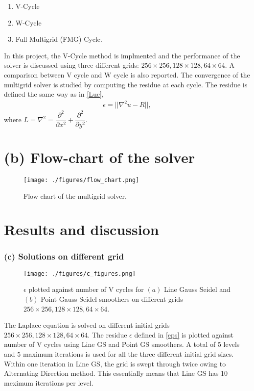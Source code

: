\documentclass[11pt]{report}
\begin{document}
\begin{enumerate}
\begin{enumerate}
\item V-Cycle
\item W-Cycle
\item Full Multigrid (FMG) Cycle.
\end{enumerate}
In this project, the V-Cycle method is implmented and the performance of the solver is discussed using three different grids: $256\times256, 128\times 128, 64\times64$. A comparison between V cycle and W cycle is also reported. The convergence of the multigrid solver is studied by computing the residue at each cycle. The residue is defined the same way as in \eqref{Lue},
\begin{align}
\epsilon=|\!|\nabla^2u-R|\!|, \label{eps}
\end{align}
where $L=\nabla^2=\dfrac{\partial^2}{\partial x^2}+\dfrac{\partial^2}{\partial y^2}$.

\end{enumerate}


\section{(b) Flow-chart of the solver}
\begin{figure}[H]
	\begin{center}
		\texttt{[image: ./figures/flow\_chart.png]}
	\end{center}
	\caption{Flow chart of the multigrid solver. }
\end{figure}

\section{Results and discussion}
\subsubsection{(c) Solutions on different grid}
\begin{figure}[H]
\begin{center}
\texttt{[image: ./figures/c\_figures.png]}
\end{center}
\caption{$\epsilon$ plotted against number of V cycles for $(a)$ Line Gauss Seidel and $(b)$ Point Gauss Seidel smoothers on different grids $256\times 256, 128\times 128, 64\times 64$. }\label{grid_solns}
\end{figure}
The Laplace equation is solved on different initial grids $256\times256,128\times128,64\times64$. The residue $\epsilon$ defined in \eqref{eps} is plotted against number of V cycles using Line GS and Point GS smoothers.
A total of 5 levels and 5 maximum iterations is used for all the three different initial grid sizes. Within one 
iteration in Line GS, the grid is swept through twice owing to Alternating Direction method. This essentially means that Line GS has 10 meximum iterations per level. 
\end{document}
